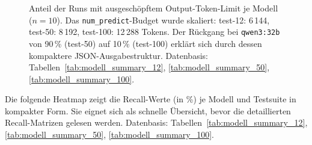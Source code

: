 \begin{figure}[htbp]
\centering
{}
\caption[Truncation-Rate im Suite-Vergleich]{Anteil der Runs mit ausgeschöpftem Output-Token-Limit je Modell ($n=10$). Das \texttt{num\_predict}-Budget wurde skaliert: test-12: 6\,144, test-50: 8\,192, test-100: 12\,288 Tokens. Der Rückgang bei \texttt{qwen3:32b} von 90\,\% (test-50) auf 10\,\% (test-100) erklärt sich durch dessen kompaktere \ac{JSON}-Ausgabestruktur. Datenbasis: Tabellen~\ref{tab:modell_summary_12}, \ref{tab:modell_summary_50}, \ref{tab:modell_summary_100}.}
\label{fig:graph_truncation}
\end{figure}

\clearpage

\label{app:graph_heatmap_demo}

\noindent Die folgende Heatmap zeigt die Recall-Werte (in \%) je Modell und Testsuite in kompakter Form. Sie eignet sich als schnelle Übersicht, bevor die detaillierten Recall-Matrizen gelesen werden. Datenbasis: Tabellen~\ref{tab:modell_summary_12}, \ref{tab:modell_summary_50}, \ref{tab:modell_summary_100}.

